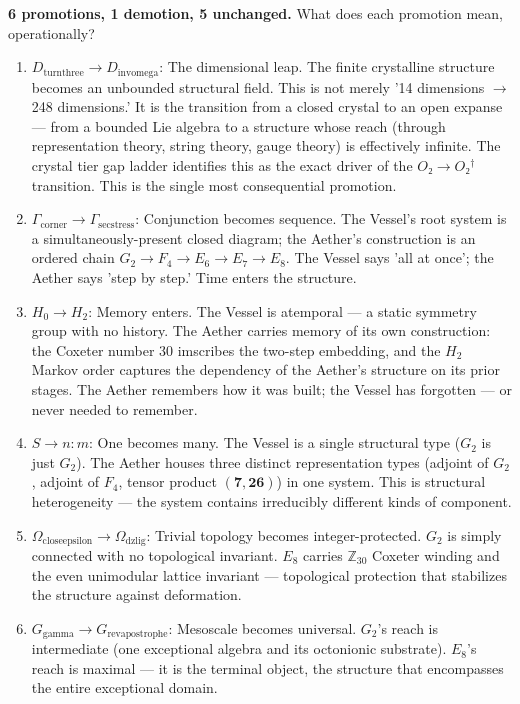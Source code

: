 \documentclass[12pt,a4paper]{article}
\begin{document}
\textbf{6 promotions, 1 demotion, 5 unchanged.} What does each promotion mean, operationally?

\begin{enumerate}
    \item \textbf{$D_{\text{turnthree}} \to D_{\text{invomega}}$}: The dimensional leap. The finite crystalline structure becomes an unbounded structural field. This is not merely '14 dimensions $\rightarrow$ 248 dimensions.' It is the transition from a closed crystal to an open expanse --- from a bounded Lie algebra to a structure whose reach (through representation theory, string theory, gauge theory) is effectively infinite. The crystal tier gap ladder identifies this as the exact driver of the $O₂ \to O₂^\dagger$ transition. This is the single most consequential promotion.
    \item \textbf{$\Gamma_{\text{corner}} \to \Gamma_{\text{secstress}}$}: Conjunction becomes sequence. The Vessel's root system is a simultaneously-present closed diagram; the Aether's construction is an ordered chain $G_2 \to F_4 \to E_6 \to E_7 \to E_8$. The Vessel says 'all at once'; the Aether says 'step by step.' Time enters the structure.
    \item \textbf{$H_0 \to H_2$}: Memory enters. The Vessel is atemporal --- a static symmetry group with no history. The Aether carries memory of its own construction: the Coxeter number 30 imscribes the two-step embedding, and the $H_2$ Markov order captures the dependency of the Aether's structure on its prior stages. The Aether remembers how it was built; the Vessel has forgotten --- or never needed to remember.
    \item \textbf{$S \to n{:}m$}: One becomes many. The Vessel is a single structural type ($G_2$ is just $G_2$). The Aether houses three distinct representation types (adjoint of $G_2$, adjoint of $F_4$, tensor product $(\mathbf{7}, \mathbf{26})$) in one system. This is structural heterogeneity --- the system contains irreducibly different kinds of component.
    \item \textbf{$\Omega_{\text{closeepsilon}} \to \Omega_{\text{dzlig}}$}: Trivial topology becomes integer-protected. $G_2$ is simply connected with no topological invariant. $E_8$ carries $\mathbb{Z}_{30}$ Coxeter winding and the even unimodular lattice invariant --- topological protection that stabilizes the structure against deformation.
    \item \textbf{$G_{\text{gamma}} \to G_{\text{revapostrophe}}$}: Mesoscale becomes universal. $G_2$'s reach is intermediate (one exceptional algebra and its octonionic substrate). $E_8$'s reach is maximal --- it is the terminal object, the structure that encompasses the entire exceptional domain.
\end{enumerate}
\end{document}
